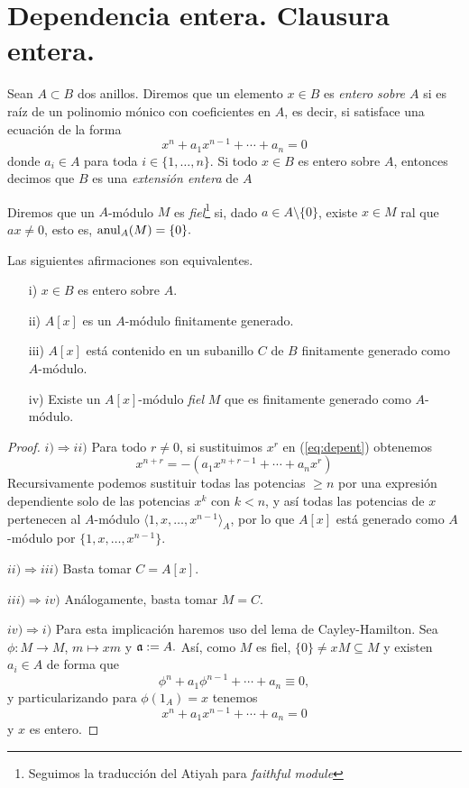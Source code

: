 \documentclass[../main.tex]{subfiles}
\begin{document}
\section{Dependencia entera. Clausura entera.}
\begin{definition}
Sean $A\subset B$ dos anillos. Diremos que un elemento $x\in B$ es \textit{entero sobre $A$} si es raíz de un polinomio mónico con coeficientes en $A$, es decir, si satisface una ecuación de la forma
\begin{equation}\label{eq:depent}
    x^n+a_1x^{n-1}+\cdots+a_n=0
\end{equation}
donde $a_i\in A$ para toda $i\in\{1,\dots,n\}.$ Si todo $x\in B$ es entero sobre $A$, entonces decimos que $B$ es una \textit{extensión entera} de $A$
\end{definition}

\begin{definition}Diremos que un $A$-módulo $M$ es \textit{fiel}\footnote{Seguimos la traducción del Atiyah para \emph{faithful module}} si, dado $a\in A\setminus\{0\}$, existe $x\in M$ ral que $ax\neq 0$, esto es, $\operatorname{anul}_A(M)=\{0\}.$
\end{definition}

\begin{proposition}\label{prop:entcarac}Las siguientes afirmaciones son equivalentes.
\begin{itemize}
    \item[i)] $x\in B$ es entero sobre $A.$
    \item[ii)] $A[x]$ es un $A$-módulo finitamente generado.
    \item[iii)] $A[x]$ está contenido en un subanillo $C$ de $B$ finitamente generado como $A$-módulo.
    \item[iv)] Existe un $A[x]$-módulo \emph{fiel} $M$ que es finitamente generado como $A$-módulo.
\end{itemize}
\end{proposition}
\begin{proof}
$i)\Rightarrow ii)$ Para todo $r\neq0$, si sustituimos $x^r$  en (\ref{eq:depent}) obtenemos
$$x^{n+r}=-(a_1x^{n+r-1}+\cdots+a_nx^r)$$
Recursivamente podemos sustituir todas las potencias $\geq n$ por una expresión dependiente solo de las potencias $x^k$ con $k<n$, y así todas las potencias de $x$ pertenecen al $A$-módulo $\langle 1,x,\dots,x^{n-1}\rangle_A$, por lo que $A[x]$ está generado como $A$-módulo por $\{1,x,\dots,x^{n-1}\}.$

$ii)\Rightarrow iii)$ Basta tomar $C=A[x].$

$iii)\Rightarrow iv)$ Análogamente, basta tomar $M=C.$

$iv)\Rightarrow i)$ Para esta implicación haremos uso del lema de Cayley-Hamilton. Sea $\phi:M\rightarrow M$, $m\mapsto xm$ y $\mathfrak{a}:= A.$ Así, como $M$ es fiel, $\{0\}\neq xM\subseteq M$ y existen $a_i\in A$ de forma que
$$\phi^n+a_1\phi^{n-1}+\cdots+a_n\equiv 0,$$
y particularizando para $\phi(1_A) = x$ tenemos
$$x^n+a_1x^{n-1}+\cdots+a_n= 0$$
y $x$ es entero.
\end{proof}
\end{document}

